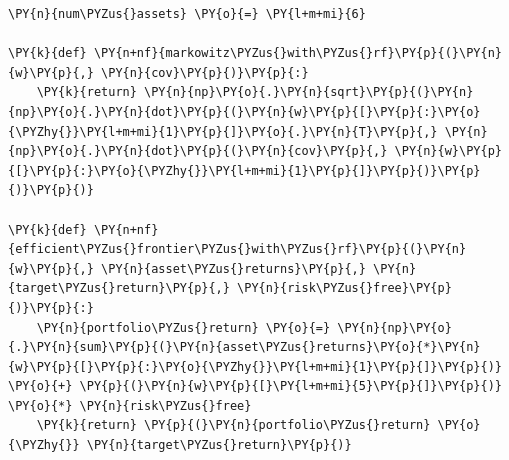 \begin{tcolorbox}[breakable, size=fbox, boxrule=1pt, pad at break*=1mm,colback=cellbackground, colframe=cellborder]
\begin{Verbatim}[commandchars=\\\{\}]
\PY{n}{num\PYZus{}assets} \PY{o}{=} \PY{l+m+mi}{6}
	
\PY{k}{def} \PY{n+nf}{markowitz\PYZus{}with\PYZus{}rf}\PY{p}{(}\PY{n}{w}\PY{p}{,} \PY{n}{cov}\PY{p}{)}\PY{p}{:}
    \PY{k}{return} \PY{n}{np}\PY{o}{.}\PY{n}{sqrt}\PY{p}{(}\PY{n}{np}\PY{o}{.}\PY{n}{dot}\PY{p}{(}\PY{n}{w}\PY{p}{[}\PY{p}{:}\PY{o}{\PYZhy{}}\PY{l+m+mi}{1}\PY{p}{]}\PY{o}{.}\PY{n}{T}\PY{p}{,} \PY{n}{np}\PY{o}{.}\PY{n}{dot}\PY{p}{(}\PY{n}{cov}\PY{p}{,} \PY{n}{w}\PY{p}{[}\PY{p}{:}\PY{o}{\PYZhy{}}\PY{l+m+mi}{1}\PY{p}{]}\PY{p}{)}\PY{p}{)}\PY{p}{)}
	
\PY{k}{def} \PY{n+nf}{efficient\PYZus{}frontier\PYZus{}with\PYZus{}rf}\PY{p}{(}\PY{n}{w}\PY{p}{,} \PY{n}{asset\PYZus{}returns}\PY{p}{,} \PY{n}{target\PYZus{}return}\PY{p}{,} \PY{n}{risk\PYZus{}free}\PY{p}{)}\PY{p}{:} 
    \PY{n}{portfolio\PYZus{}return} \PY{o}{=} \PY{n}{np}\PY{o}{.}\PY{n}{sum}\PY{p}{(}\PY{n}{asset\PYZus{}returns}\PY{o}{*}\PY{n}{w}\PY{p}{[}\PY{p}{:}\PY{o}{\PYZhy{}}\PY{l+m+mi}{1}\PY{p}{]}\PY{p}{)} \PY{o}{+} \PY{p}{(}\PY{n}{w}\PY{p}{[}\PY{l+m+mi}{5}\PY{p}{]}\PY{p}{)} \PY{o}{*} \PY{n}{risk\PYZus{}free} 
    \PY{k}{return} \PY{p}{(}\PY{n}{portfolio\PYZus{}return} \PY{o}{\PYZhy{}} \PY{n}{target\PYZus{}return}\PY{p}{)}
	

\end{Verbatim}
\end{tcolorbox}
